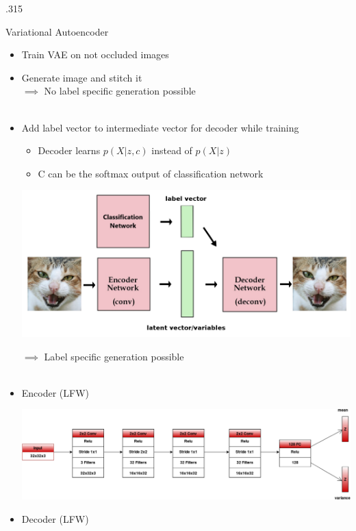 \documentclass{beamer}
\newcommand{\columnWidth}{.315}
\begin{document}
\begin{frame}[fragile]
\begin{columns}[T]
\begin{column}{\columnWidth\textwidth}
\begin{block}{Variational Autoencoder}
\begin{itemize}
   \item Train VAE on not occluded images
   \item Generate image and stitch it\\
  $\implies$ No label specific generation possible
  \\ \ \\
  \item Add label vector to intermediate vector for decoder while training \\
  \begin{itemize}
    \item Decoder learns $p(X|z,c)$ instead of $p(X|z)$
    \item C can be the softmax output of classification network
  \end{itemize}
  \begin{center}
      \includegraphics[width=.90\textwidth]{autoenc2.png}
  \end{center}
  $\implies$ Label specific generation possible
  \\ \ \\
  \item Encoder (LFW)\\
  \begin{center}
      \includegraphics[width=.90\textwidth]{cifar10_encoder.png}
  \end{center}
      \item Decoder (LFW)\\
      \begin{center}

\end{center}
\end{itemize}
\end{block}
\end{column}
\end{columns}
\end{frame}
\end{document}
